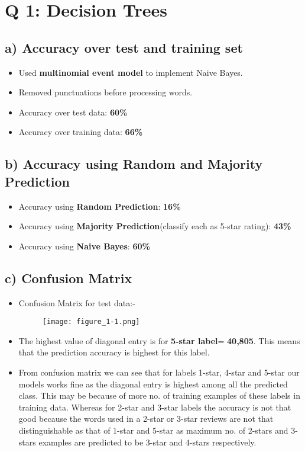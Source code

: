 \documentclass[12pt,letterpaper]{article}
\begin{document}
\section*{Q 1: Decision Trees}
\subsection*{a) Accuracy over test and training set}
\begin{itemize}
    \item Used \textbf{multinomial event model} to implement Naive Bayes.
    \item Removed punctuations before processing words.
    \item Accuracy over test data: \textbf{60\%} 
    \item Accuracy over training data: \textbf{66\%}
\end{itemize}
\subsection*{b) Accuracy using Random and Majority Prediction}
\begin{itemize}
    \item Accuracy using \textbf{Random Prediction}:  \textbf{16\%}
    \item Accuracy using \textbf{Majority Prediction}(classify each as 5-star rating):  \textbf{43\%}
    \item Accuracy using \textbf{Naive Bayes}: \textbf{60\%}
\end{itemize}
\subsection*{c) Confusion Matrix}
\begin{itemize}
    \item Confusion Matrix for test data:-
    \begin{figure}[H]
    \centering
    \texttt{[image: figure\_1-1.png]}
    \end{figure}

    \item The highest value of diagonal entry is for \textbf{5-star label}= \textbf{40,805}. This means that the prediction accuracy is highest for this label.
    \item From confusion matrix we can see that for labels 1-star, 4-star and 5-star our models works fine as the diagonal entry is highest among all the predicted class. This may be because of more no. of training examples of these labels in training data. Whereas for 2-star and 3-star labels the accuracy is not that good because the words used in a 2-star or 3-star reviews are not that distinguishable as that of 1-star and 5-star as maximum no. of 2-stars and 3-stars examples are predicted to be 3-star and 4-stars respectively.
\end{itemize}
\end{document}
